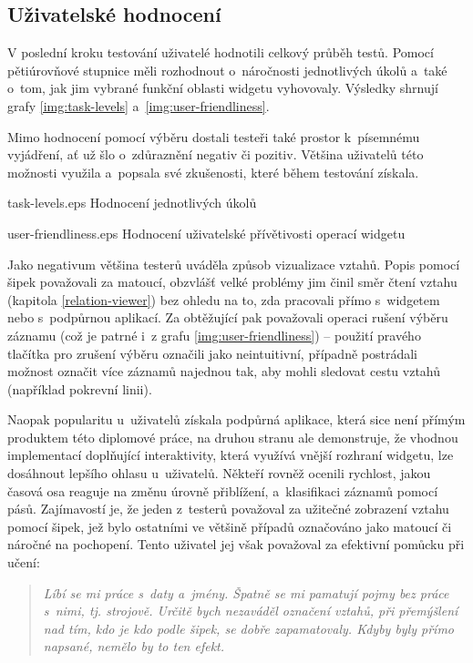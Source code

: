 		\subsection{Uživatelské hodnocení}
		\label{uzivatelske-hodnoceni}
		V poslední kroku testování uživatelé hodnotili celkový průběh testů. Pomocí pětiúrovňové stupnice měli rozhodnout o~náročnosti jednotlivých úkolů a~také o~tom, jak jim vybrané funkční oblasti widgetu vyhovovaly. Výsledky shrnují grafy \ref{img:task-levels} a~\ref{img:user-friendliness}.
		
		Mimo hodnocení pomocí výběru dostali testeři také prostor k~písemnému vyjádření, ať už šlo o~zdůraznění negativ či pozitiv. Většina uživatelů této možnos\-ti využila a~popsala své zkušenosti, které během testování získala.
		
		{}{task-levels.eps}
		{Hodnocení jednotlivých úkolů}{}
		
		{}{user-friendliness.eps}
		{Hodnocení uživatelské přívětivosti operací widgetu}{}
		
		\clearpage		
		
		Jako negativum většina testerů uváděla způsob vizualizace vztahů. Popis pomocí šipek považovali za matoucí, obzvlášť velké problémy jim činil směr čtení vztahu (kapitola \ref{relation-viewer}) bez ohledu na to, zda pracovali přímo s~widgetem nebo s~podpůrnou aplikací. Za obtěžující pak považovali operaci rušení výběru záznamu (což je patrné i~z grafu \ref{img:user-friendliness}) -- použití pravého tlačítka pro zrušení výběru označili jako neintuitivní, případně postrádali možnost označit více záznamů najednou tak, aby mohli sledovat cestu vztahů (například pokrevní linii).
		
		Naopak popularitu u~uživatelů získala podpůrná aplikace, která sice není přímým produktem této diplomové práce, na druhou stranu ale demonstruje, že vhodnou implementací doplňující interaktivity, která využívá vnější rozhraní wid\-getu, lze dosáhnout lepšího ohlasu u~uživatelů. Někteří rovněž ocenili rychlost, jakou časová osa reaguje na změnu úrovně přiblížení, a~klasifikaci záznamů pomocí pásů. Zajímavostí je, že jeden z~testerů považoval za užitečné zobrazení vztahu pomocí šipek, jež bylo ostatními ve většině případů označováno jako matoucí či náročné na pochopení. Tento uživatel jej však považoval za efektivní pomůcku při učení:
		
		\begin{quote}\it
		Líbí se mi práce s~daty a~jmény. Špatně se mi pamatují pojmy bez práce s~nimi, tj. strojově. Určitě bych nezaváděl označení vztahů, při přemýšlení nad tím, kdo je kdo podle šipek, se dobře zapamatovaly. Kdyby byly přímo napsané, nemělo by to ten efekt.
		\end{quote}
		
